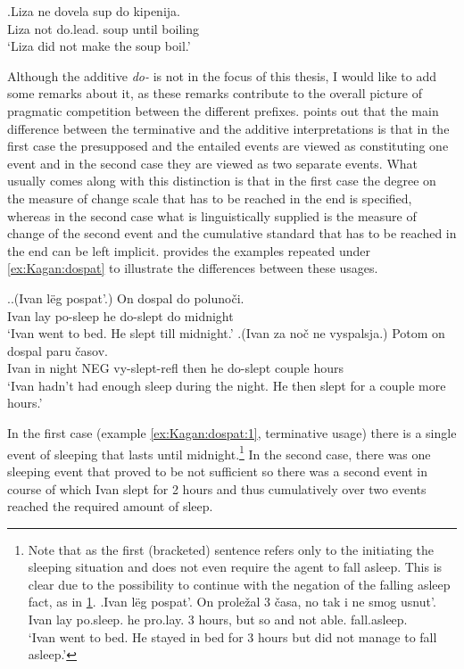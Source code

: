\exg.\label{ex:do:PP:ne}Liza ne dovela sup do kipenija.\\
Liza not do.lead. soup until boiling\\
\trans `Liza did not make the soup boil.'

Although the additive \textit{do-} is not in the focus of this thesis, I would like to add some remarks about it, as these remarks contribute to the overall picture of pragmatic competition between the different prefixes. \citet[79]{Kagan:book} points out that the main difference between the terminative and the additive interpretations is that in the first case the presupposed and the entailed events are viewed as constituting one event and in the second case they are viewed as two separate events. What usually comes along with this distinction is that in the first case the degree on the measure of change scale that has to be reached in the end is specified, whereas in the second case what is linguistically supplied is the measure of change of the second event and the cumulative standard that has to be reached in the end can be left implicit. \citet[p 79]{Kagan:book} provides the examples repeated under \ref{ex:Kagan:dospat} to illustrate the differences between these usages.

\ex.\label{ex:Kagan:dospat}\ag.\label{ex:Kagan:dospat:1}(Ivan l\"{e}g pospat'.) On dospal do poluno\v{c}i.\\
Ivan lay po-sleep he do-slept do midnight\\
\trans `Ivan went to bed. He slept till midnight.'
\bg.\label{ex:Kagan:dospat:2}(Ivan za no\v{c} ne vyspalsja.) Potom on dospal paru \v{c}asov.\\
Ivan in night NEG vy-slept-refl then he do-slept couple hours\\
\trans `Ivan hadn't had enough sleep during the night. He then slept for a couple more hours.'

In the first case (example \ref{ex:Kagan:dospat:1}, terminative usage) there is a single event of sleeping that lasts until midnight.\footnote{Note that as the first (bracketed) sentence refers only to the initiating the sleeping situation and does not even require the agent to fall asleep. This is clear due to the possibility to continue with the negation of the falling asleep fact, as in \ref{ex:dospat:no}.
\exg.\label{ex:dospat:no}Ivan l\"{e}g pospat'. On prole\v{z}al 3 \v{c}asa, no tak i ne smog usnut'.\\
Ivan lay po.sleep. he pro.lay. 3 hours, but so and not able. fall.asleep.\\
\trans `Ivan went to bed. He stayed in bed for 3 hours but did not manage to fall asleep.'

} In the second case, there was one sleeping event that proved to be not sufficient so there was a second event in course of which Ivan slept for 2 hours and thus cumulatively over two events reached the required amount of sleep. 

